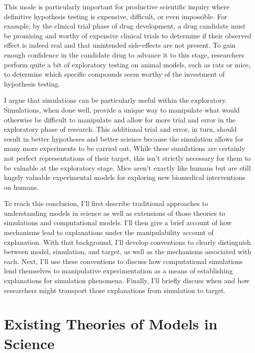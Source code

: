 This mode is particularly important for productive scientific inquiry
where definitive hypothesis testing is expensive, difficult, or even
impossible. For example, by the clinical trial phase of drug
development, a drug candidate must be promising and worthy of expensive
clinical trials to determine if their observed effect is indeed real and
that unintended side-effects are not present. To gain enough confidence
in the candidate drug to advance it to this stage, researchers perform
quite a bit of exploratory testing on animal models, such as rats or
mice, to determine which specific compounds seem worthy of the
investment of hypothesis testing.

I argue that simulations can be particularly useful within the
exploratory. Simulations, when done well, provide a unique way to
manipulate what would otherwise be difficult to manipulate and allow for
more trial and error in the exploratory phase of research. This
additional trial and error, in turn, should result in better hypotheses
and better science because the simulation allows for many more
experiments to be carried out. While these simulations are certainly not
perfect representations of their target, this isn't strictly necessary
for them to be valuable at the exploratory stage. Mice aren't exactly
like humans but are still hugely valuable experimental models for
exploring new biomedical interventions on humans.

To reach this conclusion, I'll first describe traditional approaches to
understanding models in science as well as extensions of those theories
to simulations and computational models. I'll then give a brief account
of how mechanisms lead to explanations under the manipulability account
of explanation. With that background, I'll develop conventions to
clearly distinguish between model, simulation, and target, as well as
the mechanisms associated with each. Next, I'll use these conventions to
discuss how computational simulations lend themselves to manipulative
experimentation as a means of establishing explanations for simulation
phenomena. Finally, I'll briefly discuss when and how researchers might
transport those explanations from simulation to target.

\hypertarget{existing-theories-of-models-in-science}{%
\section{Existing Theories of Models in
Science}\label{existing-theories-of-models-in-science}}

